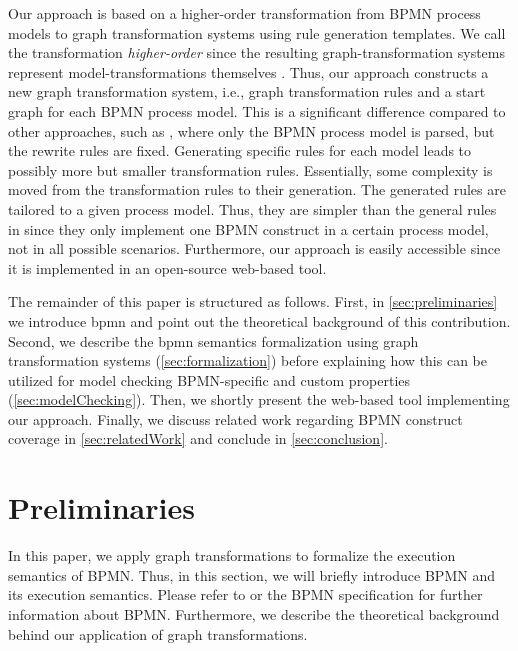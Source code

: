 \documentclass[runningheads]{llncs}
\begin{document}
Our approach is based on a higher-order transformation from BPMN process models to graph transformation systems using rule generation templates.
We call the transformation \textit{higher-order} since the resulting graph-transformation systems represent model-transformations themselves \cite{tisiUseHigherOrderModel2009}.
Thus, our approach constructs a new graph transformation system, i.e., graph transformation rules and a start graph for each BPMN process model.
This is a significant difference compared to other approaches, such as \cite{corradiniFormalApproachAnalysis2021,vangorpVisualTokenbasedFormalization2013}, where only the BPMN process model is parsed, but the rewrite rules are fixed.
Generating specific rules for each model leads to possibly more but smaller transformation rules.
Essentially, some complexity is moved from the transformation rules to their generation.
The generated rules are tailored to a given process model.
Thus, they are simpler than the general rules in \cite{vangorpVisualTokenbasedFormalization2013} since they only implement one BPMN construct in a certain process model, not in all possible scenarios.
Furthermore, our approach is easily accessible since it is implemented in an open-source web-based tool.

The remainder of this paper is structured as follows.
First, in \autoref{sec:preliminaries} we introduce \gls*{bpmn} and point out the theoretical background of this contribution.
Second, we describe the \gls*{bpmn} semantics formalization using graph transformation systems (\autoref{sec:formalization}) before explaining how this can be utilized for model checking BPMN-specific and custom properties (\autoref{sec:modelChecking}).
Then, we shortly present the web-based tool implementing our approach.
Finally, we discuss related work regarding BPMN construct coverage in \autoref{sec:relatedWork} and conclude in \autoref{sec:conclusion}.

\section{Preliminaries} \label{sec:preliminaries}
In this paper, we apply graph transformations to formalize the execution semantics of BPMN.
Thus, in this section, we will briefly introduce BPMN and its execution semantics.
Please refer to \cite{freundRealLifeBPMNUsing2019} or the BPMN specification \cite{objectmanagementgroupBusinessProcessModel2013} for further information about BPMN.
Furthermore, we describe the theoretical background behind our application of graph transformations.
\end{document}

